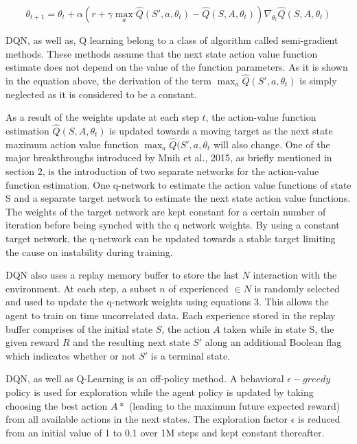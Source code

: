 \documentclass{article}
\begin{document}
\begin{equation}
\theta_{t+1} = \theta_{t} + \alpha \left( r + \gamma \max_{a} \hat{Q}(S',a,\theta_{t}) - \hat{Q}(S,A,\theta_{t}) \right) \nabla_{\theta_{t}} \hat{Q}(S,A,\theta_{t})
\end{equation}

DQN, as well as, Q learning belong to a class of algorithm called semi-gradient methods. These methods assume that the next state action value function estimate does not depend on the value of the function parameters. As it is shown in the equation above, the derivation of the term $\max_{a} \hat{Q}(S',a,\theta_{t}) $ is simply neglected as it is considered to be a constant.

As a result of the weights update at each step $t$, the action-value function estimation $\hat{Q}(S, A,\theta_{t})$ is updated towards a moving target as the next state maximum action value function $\max_{a} \hat{Q}(S',a,\theta_{t}$ will also change. One of the major breakthroughs introduced by Mnih et al., 2015, as briefly mentioned in section 2, is the introduction of two separate networks for the action-value function estimation. One q-network to estimate the action value functions of state S and a separate target network to estimate the next state action value functions. The weights of the target network are kept constant for a certain number of iteration before being synched with the q network weights. By using a constant target network, the q-network can be updated towards a stable target limiting the cause on instability during training.

DQN also uses a replay memory buffer to store the last $N$ interaction with the environment. At each step, a subset $n$ of experienced $\in N $ is randomly selected and used to update the q-network weights using equations 3. This allows the agent to train on time uncorrelated data. Each experience stored in the replay buffer comprises of the initial state $S$, the action $A$ taken while in state S, the given reward $R$ and the resulting next state $S'$ along an additional Boolean flag which indicates whether or not $S'$ is a terminal state. 

DQN, as well as Q-Learning is an off-policy method. A behavioral $\epsilon-greedy$ policy is used for exploration while the agent policy is updated by taking choosing the best action $A*$ (leading to the maximum future expected reward) from all available actions in the next states.
The exploration factor $\epsilon$ is reduced from an initial value of 1 to 0.1 over 1M steps and kept constant thereafter.
\end{document}
